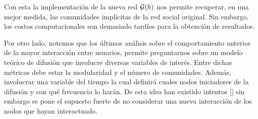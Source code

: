 \documentclass[../main.tex]{subfiles}
\begin{document}
\onehalfspacing

Con esta la implementación de la nueva red $\mathcal{G}(h)$ nos permite recuperar, en una mejor medida, las comunidades implícitas de la red social original. Sin embargo, los costos computacionales son demasiado tardíos para la obtención de resultados.  

\onehalfspacing

Por otro lado, notemos que los últimos análisis sobre el comportamiento anterior de la mayor interacción entre usuarios, permite preguntarnos sobre un modelo teórico de difusión que involucre diversas variables de interés. Entre dichas métricas debe estar la modularidad y el número de comunidades. Además, involucrar una variable del tiempo la cual definirá cuales nodos iniciadores de la difusión y con qué frecuencia lo harán. De esta idea han existido intentos [\cite{D_weng2014predicting,Nematzadeh2014}] sin embargo se pone el supuesto fuerte de no considerar una nueva interacción de los nodos que hayan interactuado.
\end{document}
